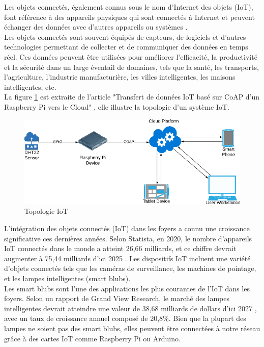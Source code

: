 Les objets connectés, également connus sous le nom d'Internet des objets (IoT), font référence à des appareils physiques qui sont connectés à Internet et peuvent échanger des données avec d'autres appareils ou systèmes \cite{gazis2021iot}. \\

Les objets connectés sont souvent équipés de capteurs, de logiciels et d'autres technologies permettant de collecter et de communiquer des données en temps réel. Ces données peuvent être utilisées pour améliorer l'efficacité, la productivité et la sécurité dans un large éventail de domaines, tels que la santé, les transports, l'agriculture, l'industrie manufacturière, les villes intelligentes, les maisons intelligentes, etc. \\

La figure \ref{Chap4.2.1} est extraite de l'article "Transfert de données IoT basé sur CoAP d'un Raspberry Pi vers le Cloud" \cite{Scott2019CoAPBI}, elle illustre la topologie d'un système IoT.

\begin{figure}[H]
\centering
\includegraphics[width=15cm]{Images/IoT-Topo2.png}
\caption{Topologie IoT}
\label{Chap4.2.1}
\end{figure}


L'intégration des objets connectés (IoT) dans les foyers a connu une croissance significative ces dernières années. Selon Statista, en 2020, le nombre d'appareils IoT connectés dans le monde a atteint 26,66 milliards, et ce chiffre devrait augmenter à 75,44 milliards d'ici 2025 \cite{statista-iot-2025}. Les dispositifs IoT incluent une variété d'objets connectés tels que les caméras de surveillance, les machines de pointage, et les lampes intelligentes (smart blubs). \\

Les smart blubs sont l'une des applications les plus courantes de l'IoT dans les foyers. Selon un rapport de Grand View Research, le marché des lampes intelligentes devrait atteindre une valeur de 38,68 milliards de dollars d'ici 2027 \cite{market-splash-automation}, avec un taux de croissance annuel composé de 20,8\%. Bien que la plupart des lampes ne soient pas des smart blubs, elles peuvent être connectées à notre réseau grâce à des cartes IoT comme Raspberry Pi ou Arduino.\\

